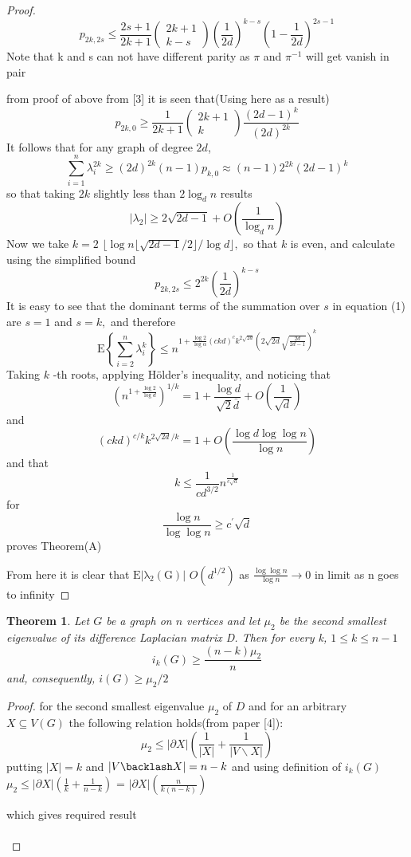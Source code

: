 \documentclass[oneside]{book}
\newtheorem{theorem}{Theorem}[section]
\theoremstyle{definition}
\begin{document}
\begin{proof}
$$
p_{2 k, 2 s} \leq \frac{2 s+1}{2 k+1}\left(\begin{array}{c}
2 k+1 \\
k-s
\end{array}\right)\left(\frac{1}{2 d}\right)^{k-s}\left(1-\frac{1}{2 d}\right)^{2 s-1}
$$
 Note that k and s can not have different parity as  $\pi$ and $\pi^{-1}$ will get vanish in pair\par
   from proof of above from [3] it is seen that(Using here as a result)  
$$ p_{2 k, 0} \geq \frac{1}{2 k+1}\left(\begin{array}{c}
2 k+1 \\
k
\end{array}\right) \frac{(2 d-1)^{k}}{(2 d)^{2 k}}$$
It follows that for any graph of degree $2 d$,
$$
\sum_{i=1}^{n} \lambda_{i}^{2 k} \geq(2 d)^{2 k}(n-1) p_{k, 0} \approx(n-1) 2^{2 k}(2 d-1)^{k}
$$
so that taking $2 k$ slightly less than $2 \log _{d} n$ results 
$$
\left|\lambda_{2}\right| \geq 2 \sqrt{2 d-1}+O\left(\frac{1}{\log _{d} n}\right)
$$
Now we take $k=2$ $\lfloor\log n\lfloor\sqrt{2 d-1} / 2\rfloor / \log d\rfloor,$ so that $k$ is even, and calculate
using the simplified bound
$$
p_{2 k, 2 s} \leq 2^{2 k}\left(\frac{1}{2 d}\right)^{k-s}
$$
It is easy to see that the dominant terms of the summation over $s$ in equation (1) are $s=1$ and $s=k,$ and therefore
$$
\mathrm{E}\left\{\sum_{i=2}^{n} \lambda_{i}^{k}\right\} \leq n^{1+\frac{\log 2}{\log \alpha}(c k d)^{c} k^{2 \sqrt{2 d}}(2 \sqrt{2 d} \sqrt{\frac{2 d}{2 d-1}})^{k}}
$$
Taking $k$ -th roots, applying Hölder's  inequality, and noticing that
$$
\left(n^{1+\frac{\log 2}{\log d}}\right)^{1 / k}=1+\frac{\log d}{\sqrt{2} \bar{d}}+O\left(\frac{1}{\sqrt{d}}\right)
$$
and 
$$
(c k d)^{c / k} k^{2 \sqrt{2 d} / k}=1+O\left(\frac{\log d \log \log n}{\log n}\right)
$$
and that
$$
k \leq \frac{1}{c d^{3 / 2}} n^{\frac{1}{c \sqrt{a}}}
$$
for
$$
\frac{\log n}{\log \log n} \geq c^{\prime} \sqrt{d}
$$
proves Theorem(A)  \par 
From here it is clear that $\mathrm{E|\lambda_{2}(G)|}$ \leq $O(d^{1/2})$ as $\frac{ \log \log n}{\log n}\rightarrow 0$ in limit  as n goes to  infinity 
\end{proof} 
\begin{theorem} 
 Let $G$ be a graph on $n$ vertices and let $\mu_{2}$ be the second smallest eigenvalue of its difference Laplacian matrix D. Then for every k, 
$1 \leq k \leq n-1$
$$
i_{k}(G) \geq \frac{(n-k) \mu_{2}}{n}
$$
and, consequently, $i(G) \geq \mu_{2} / 2$ \par
\end{theorem} 
\begin{proof}
for the second smallest eigenvalue $\mu_{2}$ of $D$ and for an arbitrary $X \subseteq V(G)$ the following relation holds(from paper [4]):
$$
\mu_{2} \leq|\partial X|\left(\frac{1}{|X|}+\frac{1}{|V \backslash X|}\right)
$$
putting $|X| = k $ and $|V\backlash X| = n-k $ and using definition of $i_k(G)$ 
 $ \mu_{2} \leq|\partial X|\left(\frac{1}{k}+\frac{1}{n-k}\right)$ = $|\partial X|\left(\frac{n}{k(n-k)}\right) $ \par
 which gives required result\\\\
 \end{proof} 
 
\end{document}
